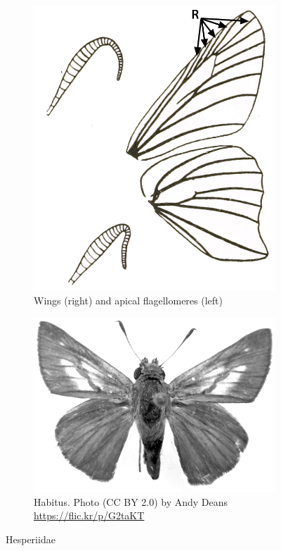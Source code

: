 \documentclass[letterpaper, 11pt]{article}
\begin{document}
\begin{figure}[ht!]
    \centering
    \begin{subfigure}[ht!]{0.36\textwidth}
        \includegraphics[width=\textwidth]{HesperiidWings}
        \caption{Wings (right) and apical flagellomeres (left) \citep[][Fig. 5]{bhl37915}}
        \label{fig:hesperiid1}
    \end{subfigure}
    \hfill %
    \begin{subfigure}[ht!]{0.55\textwidth}
        \includegraphics[width=\textwidth]{hesperiid.png}
        \caption{Habitus. Photo (CC BY 2.0) by Andy Deans \url{https://flic.kr/p/G2taKT}}
        \label{fig:hesperiid2}
    \end{subfigure}
    \caption{Hesperiidae}\label{fig:hesperiids}
\end{figure}
\end{document}
